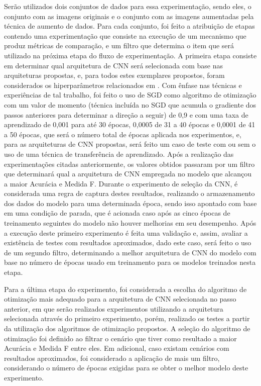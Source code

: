 \documentclass[
	12pt,				%
	oneside,			%
	a4paper,			%
	english,			%
	brazil				%
	]{abntex2ppgsi}
\begin{document}
Serão utilizados dois conjuntos de dados para essa experimentação, sendo eles, o conjunto com as imagens originais e o conjunto com as imagens aumentadas pela técnica de aumento de dados. Para cada conjunto, foi feito a atribuição de etapas contendo uma experimentação que consiste na execução de um mecanismo que produz métricas de comparação, e um filtro que determina o item que será utilizado na próxima etapa do fluxo de experimentação. A primeira etapa consiste em determinar qual arquitetura de CNN será selecionada com base nas arquiteturas propostas, e, para todos estes exemplares propostos, foram considerados os hiperparâmetros relacionados em . Com ênfase nas técnicas e experiências de tal trabalho, foi feito o uso de SGD como algoritmo de otimização com um valor de momento (técnica incluída no SGD que acumula o gradiente dos passos anteriores para determinar a direção a seguir) de 0,9 e com uma taxa de aprendizado de 0,001 para até 30 épocas, 0,0005 de 31 a 40 épocas e 0,0001 de 41 a 50 épocas, que será o número total de épocas aplicada nos experimentos, e, para as arquiteturas de CNN propostas, será feito um caso de teste com ou sem o uso de uma técnica de transferência de aprendizado. Após a realização das experimentações citadas anteriormente, os valores obtidos passaram por um filtro que determinará qual a arquitetura de CNN empregada no modelo que alcançou a maior Acurácia e Medida F. Durante o experimento de seleção da CNN, é considerada uma regra de captura destes resultados, realizando o armazenamento dos dados do modelo para uma determinada época, sendo isso apontado com base em uma condição de parada, que é acionada caso após as cinco épocas de treinamento seguintes do modelo não houver melhorias em seu desempenho. Após a execução deste primeiro experimento é feita uma validação e, assim, avaliar a existência de testes com resultados aproximados, dado este caso, será feito o uso de um segundo filtro, determinando a melhor arquitetura de CNN do modelo com base no número de épocas usado em treinamento para os modelos treinados nesta etapa.

Para a última etapa do experimento, foi considerada a escolha do algoritmo de otimização mais adequado para a arquitetura de CNN selecionada no passo anterior, em que serão realizados experimentos utilizando a arquitetura selecionada através do primeiro experimento, porém, realizado os testes a partir da utilização dos algoritmos de otimização propostos. A seleção do algoritmo de otimização foi definido ao filtrar o cenário que tiver como resultado a maior Acurácia e Medida F entre eles. Em adicional, caso existam cenários com resultados aproximados, foi considerado a aplicação de mais um filtro, considerando o número de épocas exigidas para se obter o melhor modelo deste experimento.
\end{document}

